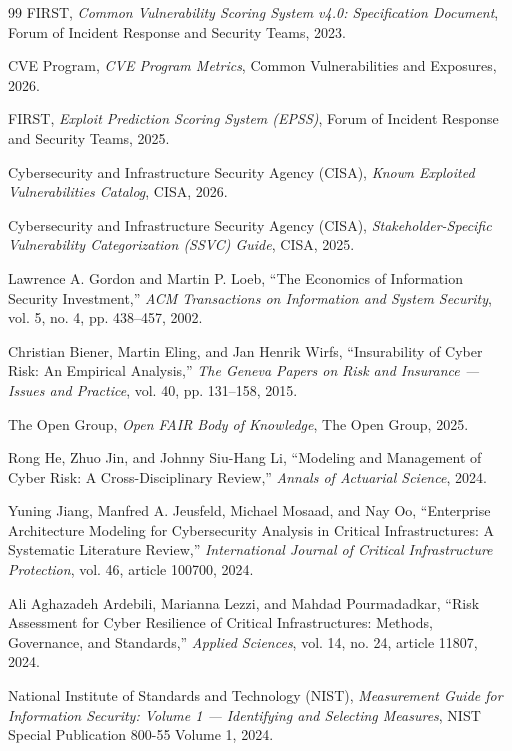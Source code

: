 \documentclass[11pt]{article}
\begin{document}
\begin{thebibliography}{99}
  FIRST,
  \emph{Common Vulnerability Scoring System v4.0: Specification Document},
  Forum of Incident Response and Security Teams, 2023.

  CVE Program,
  \emph{CVE Program Metrics},
  Common Vulnerabilities and Exposures, 2026.

  FIRST,
  \emph{Exploit Prediction Scoring System (EPSS)},
  Forum of Incident Response and Security Teams, 2025.

  Cybersecurity and Infrastructure Security Agency (CISA),
  \emph{Known Exploited Vulnerabilities Catalog},
  CISA, 2026.

  Cybersecurity and Infrastructure Security Agency (CISA),
  \emph{Stakeholder-Specific Vulnerability Categorization (SSVC) Guide},
  CISA, 2025.

  Lawrence A. Gordon and Martin P. Loeb,
  ``The Economics of Information Security Investment,''
  \emph{ACM Transactions on Information and System Security},
  vol. 5, no. 4, pp. 438--457, 2002.

  Christian Biener, Martin Eling, and Jan Henrik Wirfs,
  ``Insurability of Cyber Risk: An Empirical Analysis,''
  \emph{The Geneva Papers on Risk and Insurance --- Issues and Practice},
  vol. 40, pp. 131--158, 2015.

  The Open Group,
  \emph{Open FAIR Body of Knowledge},
  The Open Group, 2025.

  Rong He, Zhuo Jin, and Johnny Siu-Hang Li,
  ``Modeling and Management of Cyber Risk: A Cross-Disciplinary Review,''
  \emph{Annals of Actuarial Science}, 2024.

  Yuning Jiang, Manfred A. Jeusfeld, Michael Mosaad, and Nay Oo,
  ``Enterprise Architecture Modeling for Cybersecurity Analysis in Critical Infrastructures: A Systematic Literature Review,''
  \emph{International Journal of Critical Infrastructure Protection},
  vol. 46, article 100700, 2024.

  Ali Aghazadeh Ardebili, Marianna Lezzi, and Mahdad Pourmadadkar,
  ``Risk Assessment for Cyber Resilience of Critical Infrastructures: Methods, Governance, and Standards,''
  \emph{Applied Sciences},
  vol. 14, no. 24, article 11807, 2024.

  National Institute of Standards and Technology (NIST),
  \emph{Measurement Guide for Information Security: Volume 1 --- Identifying and Selecting Measures},
  NIST Special Publication 800-55 Volume 1, 2024.


\end{thebibliography}
\end{document}
